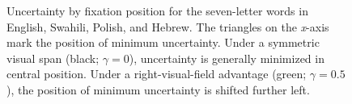 \documentclass[doc,biblatex,floatsintext]{apa7}
\begin{document}
\begin{figure}
\vspace*{2pt}
\caption{Uncertainty by fixation position for the seven-letter words in English, Swahili, Polish, and Hebrew. The triangles on the \textit{x}-axis mark the position of minimum uncertainty. Under a symmetric visual span (black; $\gamma=0$), uncertainty is generally minimized in central position. Under a right-visual-field advantage (green; $\gamma=0.5$), the position of minimum uncertainty is shifted further left.}
\label{fig02}
\end{figure}
\end{document}
